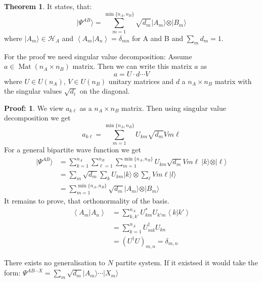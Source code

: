 \documentclass[12pt]{book}
\theoremstyle{definition}
\newtheorem*{theo}{\bfseries Theorem}
\newtheorem*{prf}{Proof:}
\newcommand{\de}{\delta}
\newcommand{\scalar}[1]{\left\langle {#1}\right\rangle}
\let\oldsum\sum
\renewcommand{\sum}[2]{\oldsum\limits_{#1}^{#2}}
\newcommand{\ket}[1]{\vert {#1} \rangle}
\DeclareMathOperator{\mat}{Mat}
\begin{document}
\begin{theo}
It states, that:
\begin{equation}
  \ket{\Psi^{AB}} = \sum{m=1}{\min\{n_A, n_B\}} \sqrt{d_m} \ket{A_m} \otimes \ket{B_m}
\end{equation}
where $\ket{A_m} \in \mathcal H_A$ and $\scalar{A_m \vert A_{n}} = \de_{mn}$ for A and B and $\oldsum_m d_m = 1$.
\end{theo}

For the proof we need singular value decomposition: Assume $a \in \mat(n_A \times n_B)$ matrix. Then we can write this matrix $a$ as
\begin{equation*}
  a = U \cdot d \cdots V
\end{equation*}
where $U \in U(n_A)$, $V \in U(n_B)$ unitary matrices and $d$ a  $n_A \times n_B$ matrix with the singular values $\sqrt{d_i}$ on the diagonal.
\begin{prf}

We view $a_{k\ell}$ as a $n_A \times n_B$ matrix. Then using singular value decomposition we get
\begin{equation*}
  a_{k\ell} = \sum{m=1}{\min\{n_A, n_B\}} U_{km} \sqrt{d_m} V{m\ell}
\end{equation*}
For a general bipartite wave function we get
\begin{align*}
  \ket{\Psi^{AB}} & = \sum{k=1}{n_A} \sum{\ell=1}{n_B} \sum{m=1}{\min\{n_A, n_B\}} U_{km} \sqrt{d_m} V{m\ell}\: \ket{k} \otimes \ket{\ell} \\
  & = \oldsum_{m} \sqrt{d_m} \oldsum_k U_{km} \ket{k} \otimes \oldsum_\ell V{m\ell} \ket{l} \\
  & = \sum{m=1}{\min\{n_A, n_B\}} \sqrt{d_m} \ket{A_m} \otimes \ket{B_m}
\end{align*}
It remains to prove, that orthonormality of the basis.
\begin{align*}
  \scalar{A_m \vert A_n} & = \sum{k, k'}{n_A} U_{km}^* U_{k'm} \scalar{k \vert k'} \\
  & = \sum{k=1}{n_A} U^\dagger_{mk} U_{kn} \\
  & = (U^\dagger U)_{m, n} = \de_{m,n}
\end{align*}
\end{prf}
There exists no generalisation to $N$ partite system. If it existsed it would take the form: $\Psi^{AB\cdots X} = \oldsum_m \sqrt{d_m} \ket{A_m} \cdots \ket{X_m}$
\end{document}
